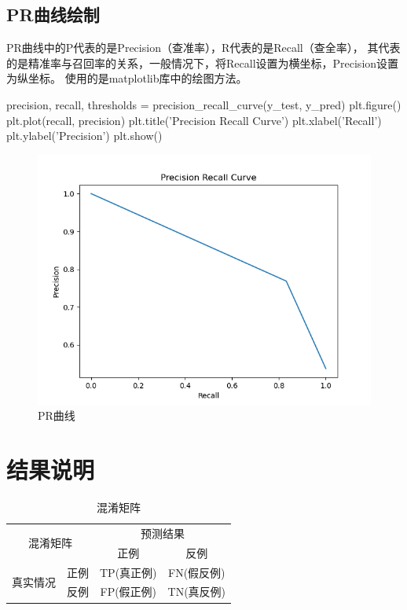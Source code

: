 \documentclass[UTF8]{ctexart}
\begin{document}
            \subsection{PR曲线绘制}
            PR曲线中的P代表的是Precision（查准率），R代表的是Recall（查全率），
            其代表的是精准率与召回率的关系，一般情况下，将Recall设置为横坐标，Precision设置为纵坐标。
            使用的是matplotlib库中的绘图方法。
            \begin{python}
precision, recall, thresholds = precision_recall_curve(y_test, y_pred)
plt.figure()
plt.plot(recall, precision)
plt.title('Precision Recall Curve')
plt.xlabel('Recall')
plt.ylabel('Precision')
plt.show()
            \end{python}
            \begin{figure}
                \centering
                \includegraphics[scale=0.8]{PR.png}
                \caption{PR曲线}
                \label{figure2}
            \end{figure}
    \newpage
    \section{结果说明}
    \begin{table}[htbp]
        \centering
        \caption{混淆矩阵}
        \begin{tabular}{|c|c|c|c|} 
        \toprule
        \multicolumn{2}{|c|}{\multirow{2}{*}{混淆矩阵}} & \multicolumn{2}{c|}{预测结果}  \\ 
        \cline{3-4}
        \multicolumn{2}{|c|}{}                      & 正例      & 反例               \\ 
        \hline
        \multirow{2}{*}{真实情况} & 正例                  & TP(真正例) & FN(假反例)          \\ 
        \cline{2-4}
                                & 反例                  & FP(假正例) & TN(真反例)          \\
        \bottomrule
        \end{tabular}
    \end{table}
    
\end{document}
